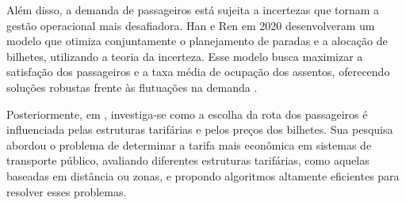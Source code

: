 Além disso, a demanda de passageiros está sujeita a incertezas que tornam a gestão operacional mais desafiadora. Han e Ren em 2020 desenvolveram um modelo que otimiza conjuntamente o planejamento de paradas e a alocação de bilhetes, utilizando a teoria da incerteza. Esse modelo busca maximizar a satisfação dos passageiros e a taxa média de ocupação dos assentos, oferecendo soluções robustas frente às flutuações na demanda \cite{han2020uncertainty}.

Posteriormente, em \cite{schoebel2021tariff}, investiga-se como a escolha da rota dos passageiros é influenciada pelas estruturas tarifárias e pelos preços dos bilhetes. Sua pesquisa abordou o problema de determinar a tarifa mais econômica em sistemas de transporte público, avaliando diferentes estruturas tarifárias, como aquelas baseadas em distância ou zonas, e propondo algoritmos altamente eficientes para resolver esses problemas.